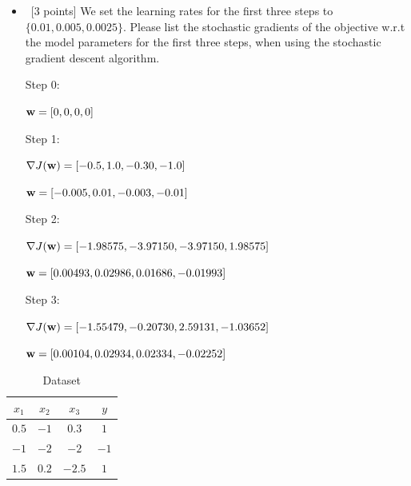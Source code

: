 \documentclass[12pt, fullpage,letterpaper]{article}
\begin{document}
\begin{enumerate}
\begin{itemize}
		\bigskip
		
		\item~[3 points] We set the learning rates for the first three steps to $\{0.01, 0.005, 0.0025\}$.  Please list the stochastic gradients of the objective w.r.t the model parameters for the first three steps, when using the stochastic gradient descent algorithm. 
		
		Step 0:
		
		${\bf w} = [0, 0, 0, 0]$
		
		Step 1:
		
		$\nabla J({\bf w}) = [-0.5, 1.0, -0.30, -1.0]$
		
		${\bf w} = [-0.005, 0.01, -0.003, -0.01]$
		
		Step 2:
		
		$\nabla J({\bf w}) = [-1.98575, -3.97150, -3.97150, 1.98575]$
		
		${\bf w} = [0.00493,  0.02986 ,  0.01686 , -0.01993]$
		
		Step 3:
		
		$\nabla J({\bf w}) = [-1.55479, -0.20730, 2.59131, -1.03652]$
		
		${\bf w} = [ 0.00104,  0.02934,  0.02334, -0.02252]$		
		
	\end{itemize}
	\begin{table}[h]
		\centering
		\begin{tabular}{ccc|c}
			$x_1$ & $x_2$ & $x_3$ &  $y$\\ 
			\hline\hline
			$0.5$ & $-1$ & $0.3$ & $1$ \\ \hline
			$-1$ & $-2$ & $-2$ & $-1$\\ \hline
			$1.5$ & $0.2$ & $-2.5$ & $1$\\ \hline
		\end{tabular}
	\caption{Dataset} 
	\label{tb:dt}
	\end{table}

	
\end{enumerate}
\end{document}
